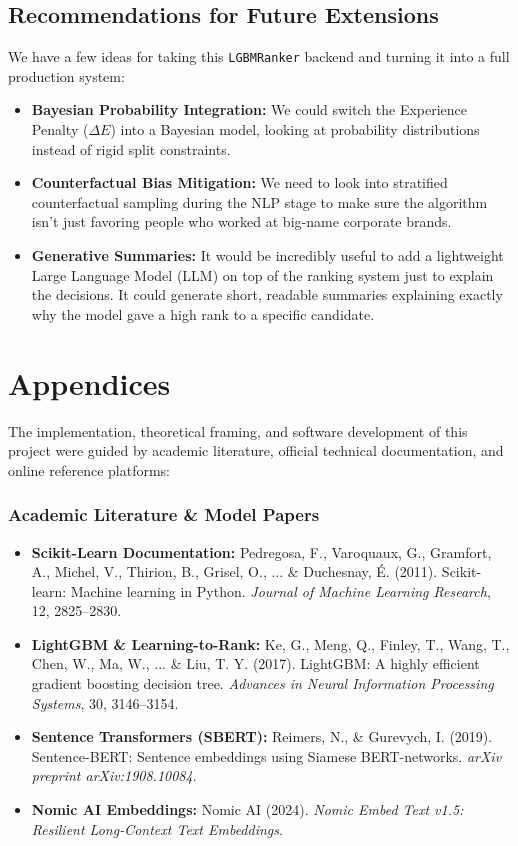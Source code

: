 \documentclass[12pt,a4paper,oneside]{report}
\begin{document}
\section{Recommendations for Future Extensions}
We have a few ideas for taking this \texttt{LGBMRanker} backend and turning it into a full production system:
\begin{itemize}
    \item \textbf{Bayesian Probability Integration:} We could switch the Experience Penalty ($\Delta E$) into a Bayesian model, looking at probability distributions instead of rigid split constraints.
    \item \textbf{Counterfactual Bias Mitigation:} We need to look into stratified counterfactual sampling during the NLP stage to make sure the algorithm isn't just favoring people who worked at big-name corporate brands.
    \item \textbf{Generative Summaries:} It would be incredibly useful to add a lightweight Large Language Model (LLM) on top of the ranking system just to explain the decisions. It could generate short, readable summaries explaining exactly why the model gave a high rank to a specific candidate.
\end{itemize}

\appendix
\chapter{Appendices}

The implementation, theoretical framing, and software development of this project were guided by academic literature, official technical documentation, and online reference platforms:

\subsection*{Academic Literature \& Model Papers}
\begin{itemize}
    \item \textbf{Scikit-Learn Documentation:} Pedregosa, F., Varoquaux, G., Gramfort, A., Michel, V., Thirion, B., Grisel, O., ... \& Duchesnay, É. (2011). Scikit-learn: Machine learning in Python. \textit{Journal of Machine Learning Research}, 12, 2825--2830.
    
    \item \textbf{LightGBM \& Learning-to-Rank:} Ke, G., Meng, Q., Finley, T., Wang, T., Chen, W., Ma, W., ... \& Liu, T. Y. (2017). LightGBM: A highly efficient gradient boosting decision tree. \textit{Advances in Neural Information Processing Systems}, 30, 3146--3154.
    
    \item \textbf{Sentence Transformers (SBERT):} Reimers, N., \& Gurevych, I. (2019). Sentence-BERT: Sentence embeddings using Siamese BERT-networks. \textit{arXiv preprint arXiv:1908.10084}.
    
    \item \textbf{Nomic AI Embeddings:} Nomic AI (2024). \textit{Nomic Embed Text v1.5: Resilient Long-Context Text Embeddings}.
\end{itemize}
\end{document}
